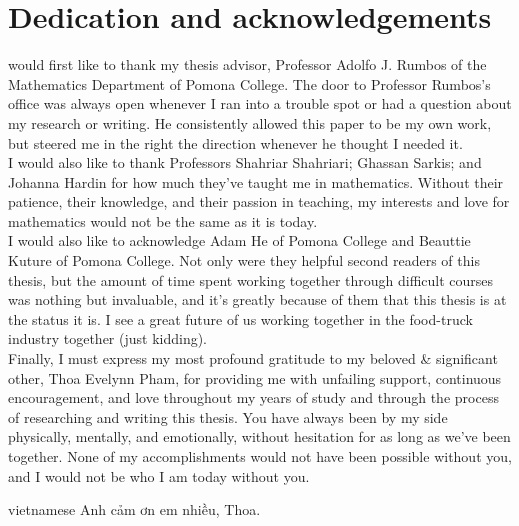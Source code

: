 %
%

\chapter*{Dedication and acknowledgements}
\begin{SingleSpace}
 would first like to thank my thesis advisor, Professor Adolfo J. Rumbos of the Mathematics Department of Pomona College. The door to Professor Rumbos's office was always open whenever I ran into a trouble spot or had a question about my research or writing. He consistently allowed this paper to be my own work, but steered me in the right the direction whenever he thought I needed it. \\

I would also like to thank Professors Shahriar Shahriari; Ghassan Sarkis; and Johanna Hardin for how much they've taught me in mathematics. Without their patience, their knowledge, and their passion in teaching, my interests and love for mathematics would not be the same as it is today. \\

I would also like to acknowledge Adam He of Pomona College and Beauttie Kuture of Pomona College. Not only were they helpful second readers of this thesis, but the amount of time spent working together through difficult courses was nothing but invaluable, and it's greatly because of them that this thesis is at the status it is. I see a great future of us working together in the food-truck industry together (just kidding). \\ 

Finally, I must express my most profound gratitude to my beloved \& significant other, Thoa Evelynn Pham, for providing me with unfailing support, continuous encouragement, and love throughout my years of study and through the process of researching and writing this thesis. You have always been by my side physically, mentally, and emotionally, without hesitation for as long as we've been together. None of my accomplishments would not have been possible without you, and I would not be who I am today without you. \\

\begin{otherlanguage*}{vietnamese}
Anh cảm ơn em nhiều, Thoa.
\end{otherlanguage*}

\end{SingleSpace}
\clearpage